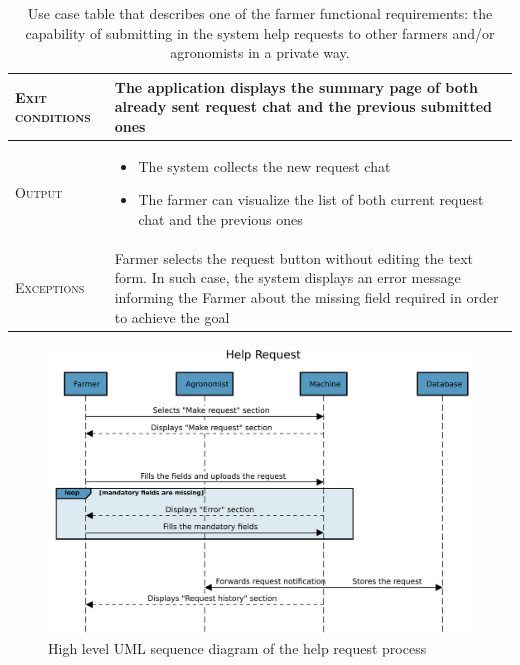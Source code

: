 \begin{table}[H]
\begin{tabular}{|l|p{}|}
        \hline %
        \textsc{Exit conditions}    &  The application displays the summary page of both already sent request chat and the previous submitted ones\\
    	\hline %
    	\textsc{Output}             &  \begin{itemize}
    	    \item The system collects the new request chat
    	    \item The farmer can visualize the list of both current request chat and the previous ones
    	\end{itemize}\\
    	\hline %
    	\textsc{Exceptions}         &  Farmer selects the request button without editing the text form. In such case, the system displays an error message informing the Farmer about the missing field required in order to achieve the goal\\
    	\hline %
        
    \end{tabular}
    \caption{\label{tab:Help_request_submission}Use case table that describes one of the farmer functional requirements: the capability of submitting in the system help requests to other farmers and/or agronomists in a private way.}

\end{table}

\begin{figure}[H]
	\centering
    \includegraphics[page=1, width=\textwidth]{Images/SeqDiag/help_request_seq_diag.pdf}
	\caption{\label{fig:help_request_seq_diag}High level UML sequence diagram of the help request process}
\end{figure}

